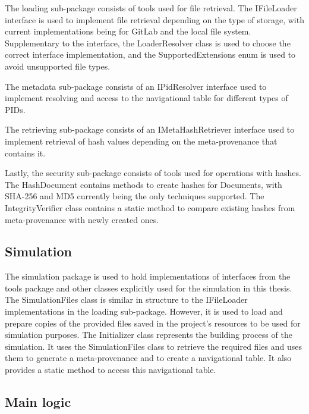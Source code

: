 \documentclass[
  digital,     %
  oneside,     %
  nosansbold,  %
  nocolorbold, %
  lof,         %
  lot,         %
]{fithesis4}
\begin{document}
The loading sub-package consists of tools used for file retrieval. The IFileLoader interface is used to implement file retrieval depending on the type of storage, with current implementations being for GitLab and the local file system. Supplementary to the interface, the LoaderResolver class is used to choose the correct interface implementation, and the SupportedExtensions enum is used to avoid unsupported file types. 

The metadata sub-package consists of an IPidResolver interface used to implement resolving and access to the navigational table for different types of PIDs. 

The retrieving sub-package consists of an IMetaHashRetriever interface used to implement retrieval of hash values depending on the meta-provenance that contains it. 

Lastly, the security sub-package consists of tools used for operations with hashes. The HashDocument contains methods to create hashes for Documents, with SHA-256 and MD5 currently being the only techniques supported. The IntegrityVerifier class contains a static method to compare existing hashes from meta-provenance with newly created ones.

\subsection{Simulation}
\vskip 0.35cm

The simulation package is used to hold implementations of interfaces from the tools package and other classes explicitly used for the simulation in this thesis. The SimulationFiles class is similar in structure to the IFileLoader implementations in the loading sub-package. However, it is used to load and prepare copies of the provided files saved in the project's resources to be used for simulation purposes. The Initializer class represents the building process of the simulation. It uses the SimulationFiles class to retrieve the required files and uses them to generate a meta-provenance and to create a navigational table. It also provides a static method to access this navigational table.

\newpage
\subsection{Main logic}
\vskip 0.35cm
\end{document}
